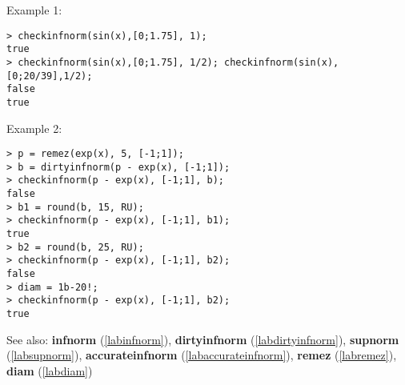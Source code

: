 \noindent Example 1: 
\begin{center}\begin{minipage}{15cm}\begin{Verbatim}[frame=single,commandchars=\\\|\~]
> checkinfnorm(sin(x),[0;1.75], 1);
true
> checkinfnorm(sin(x),[0;1.75], 1/2); checkinfnorm(sin(x),[0;20/39],1/2);
false
true
\end{Verbatim}
\end{minipage}\end{center}
\noindent Example 2: 
\begin{center}\begin{minipage}{15cm}\begin{Verbatim}[frame=single,commandchars=\\\|\~]
> p = remez(exp(x), 5, [-1;1]);
> b = dirtyinfnorm(p - exp(x), [-1;1]);
> checkinfnorm(p - exp(x), [-1;1], b);
false
> b1 = round(b, 15, RU);
> checkinfnorm(p - exp(x), [-1;1], b1);
true
> b2 = round(b, 25, RU);
> checkinfnorm(p - exp(x), [-1;1], b2);
false
> diam = 1b-20!;
> checkinfnorm(p - exp(x), [-1;1], b2);
true
\end{Verbatim}
\end{minipage}\end{center}
See also: \textbf{infnorm} (\ref{labinfnorm}), \textbf{dirtyinfnorm} (\ref{labdirtyinfnorm}), \textbf{supnorm} (\ref{labsupnorm}), \textbf{accurateinfnorm} (\ref{labaccurateinfnorm}), \textbf{remez} (\ref{labremez}), \textbf{diam} (\ref{labdiam})
